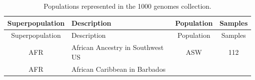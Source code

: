 \documentclass[]{book}
\theoremstyle{definition}
\theoremstyle{definition}
\theoremstyle{definition}
\theoremstyle{remark}
\begin{document}
\begin{longtable}[]{@{}clcc@{}}
\caption{\label{tab:thousand} Populations represented in the 1000 genomes
collection.}\tabularnewline
\toprule
\begin{minipage}[b]{0.14\columnwidth}\centering\strut
Superpopulation\strut
\end{minipage} & \begin{minipage}[b]{0.59\columnwidth}\raggedright\strut
Description\strut
\end{minipage} & \begin{minipage}[b]{0.09\columnwidth}\centering\strut
Population\strut
\end{minipage} & \begin{minipage}[b]{0.07\columnwidth}\centering\strut
Samples\strut
\end{minipage}\tabularnewline
\midrule
\endfirsthead
\toprule
\begin{minipage}[b]{0.14\columnwidth}\centering\strut
Superpopulation\strut
\end{minipage} & \begin{minipage}[b]{0.59\columnwidth}\raggedright\strut
Description\strut
\end{minipage} & \begin{minipage}[b]{0.09\columnwidth}\centering\strut
Population\strut
\end{minipage} & \begin{minipage}[b]{0.07\columnwidth}\centering\strut
Samples\strut
\end{minipage}\tabularnewline
\midrule
\endhead
\begin{minipage}[t]{0.14\columnwidth}\centering\strut
AFR\strut
\end{minipage} & \begin{minipage}[t]{0.59\columnwidth}\raggedright\strut
African Ancestry in Southwest US\strut
\end{minipage} & \begin{minipage}[t]{0.09\columnwidth}\centering\strut
ASW\strut
\end{minipage} & \begin{minipage}[t]{0.07\columnwidth}\centering\strut
112\strut
\end{minipage}\tabularnewline
\begin{minipage}[t]{0.14\columnwidth}\centering\strut
AFR\strut
\end{minipage} & \begin{minipage}[t]{0.59\columnwidth}\raggedright\strut
African Caribbean in Barbados\strut
\end{minipage} & \begin{minipage}[t]{0.09\columnwidth}\centering\strut

\end{minipage}
\end{longtable}
\end{document}
